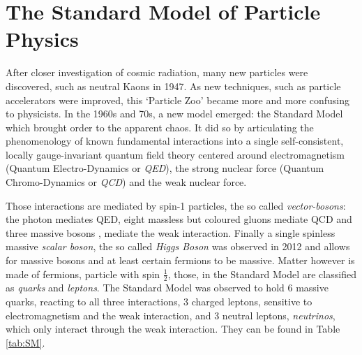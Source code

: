 
 
 \chapter{The Standard Model of Particle Physics}
 
 
 
After closer investigation of cosmic radiation, many new particles were discovered, such as neutral Kaons \PKzero in 1947. As new techniques, such as particle accelerators were improved, this `Particle Zoo' became more and more confusing to physicists. In the 1960s and 70s, a new model emerged: the Standard Model which brought order to the apparent chaos. It did so by articulating the phenomenology of known fundamental interactions into a single self-consistent, locally gauge-invariant quantum field theory centered around electromagnetism (Quantum Electro-Dynamics or \textit{QED}), the strong nuclear force (Quantum Chromo-Dynamics or \textit{QCD}) and the weak nuclear force.

Those interactions are mediated by spin-1 particles, the so called \textit{vector-bosons}: the photon \Pgamma mediates QED, eight massless but coloured gluons \Pgluon mediate QCD and three massive bosons \PZ, \PWpm mediate the weak interaction. Finally a single spinless massive \textit{scalar boson}, the so called \textit{Higgs Boson} was observed in 2012 and allows for massive bosons and at least certain fermions to be massive.
Matter however is made of fermions, particle with spin $\frac{1}{2}$, those, in the Standard Model are classified as \textit{quarks} and \textit{leptons}.
The Standard Model was observed to hold  6 massive quarks, reacting to all three interactions, 3 charged leptons, sensitive to electromagnetism and the weak interaction, and 3 neutral leptons, \textit{neutrinos}, which only interact through the weak interaction. They can be found in Table \ref{tab:SM}.

\begin{table}
\caption{Standard Model fermions}
\end{table}

